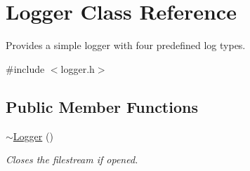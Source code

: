\hypertarget{class_logger}{}\section{Logger Class Reference}
\label{class_logger}


Provides a simple logger with four predefined log types.  




{\ttfamily \#include $<$logger.\+h$>$}

\subsection*{Public Member Functions}
\begin{DoxyCompactItemize}
\item 
\mbox{\label{class_logger_acb668a9e186a25fbaad2e4af6d1ed00a}} 
\mbox{\hyperlink{class_logger_acb668a9e186a25fbaad2e4af6d1ed00a}{$\sim$\+Logger}} ()
\begin{DoxyCompactList}\small\item\em Closes the filestream if opened. \end{DoxyCompactList}\end{DoxyCompactItemize}
